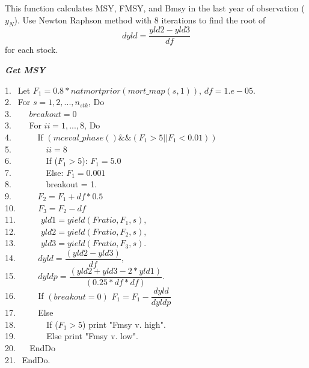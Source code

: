 \documentclass{article}
\begin{document}
This function calculates MSY, FMSY, and Bmsy in the last year of observation ($y_N$). 
Use Newton Raphson method with 8 iterations to find the root of
\begin{equation}
        dyld=\dfrac{yld2-yld3}{df}
    \end{equation}
    for each stock.\\
    \begin{algorithm}
	\caption{{\bf \textit{Get MSY}}}
	1.  $\  \ $Let $F_1=0.8*natmortprior(mort\_map(s,1))$, $df=1.e-05$. \\
	2.  $\  \ $For $s=1,2,...,n_{stk}$, Do\\
    3.  $\  \ \quad$  $breakout=0$\\
    3.  $\  \ \quad$ For $ii=1,...,8$, Do \\
	4.  $\  \ \qquad$ If $(mceval\_phase()\&\&(F_1>5||F_1< 0.01)) $\\
	5.  $\  \ \qquad$$\quad$ $ii=8$\\
	6.  $\  \ \qquad$$\quad$  If ($F_1>5$): $F_1=5.0$\\
	7.  $\  \ \qquad$$\quad$   Else: $F_1=0.001$\\
	8.  $\  \ \qquad$$\quad$   breakout = 1. \\
	9.  $\  \ \qquad$   $F_2 = F_1+df*0.5$\\
	10. $\qquad$  $F_3 = F_2 -df$\\
	11. $\quad$ $\quad$  $yld1 = yield(Fratio, F_1,s),$\\
    12. $\quad$ $\quad$  $yld2=yield(Fratio,F_2,s),$\\
    13. $\quad$ $\quad$  $yld3=yield(Fratio,F_3,s).$\\
    14. $\quad$$\quad$   $dyld=\dfrac{(yld2-yld3)}{df},$\\
    15. $\quad$$\quad$   $dyldp=\dfrac{(yld2+yld3-2*yld1)}{(0.25*df*df)}$.\\
    16. $\quad$$\quad$   If $(breakout=0)$ $F_1=F_{1}-\dfrac{dyld}{dyldp}$\\
    17. $\quad$$\quad$   Else \\
    18. $\qquad$$\quad$   If ($F_1>5$) print "Fmsy v. high". \\
    19. $\qquad$$\quad$   Else print "Fmsy v. low". \\
    20. $\quad$ EndDo\\
    21. $\  \ $EndDo.
    
\end{algorithm}
\end{document}
